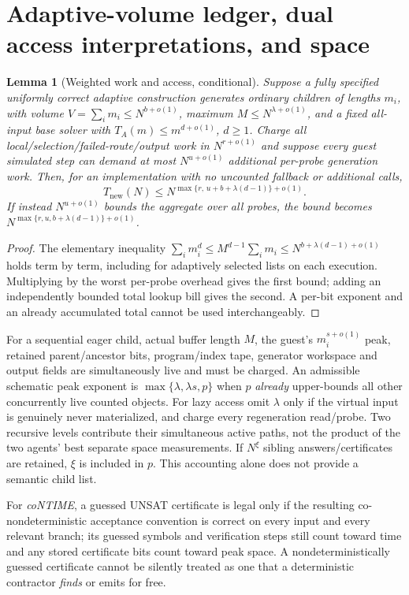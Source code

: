 \documentclass[11pt]{article}
\newtheorem{lemma}[theorem]{Lemma}
\begin{document}
\section{Adaptive-volume ledger, dual access interpretations, and space}
\begin{lemma}[Weighted work and access, conditional]\label{lem:volume}
Suppose a fully specified uniformly correct adaptive construction generates ordinary children of lengths $m_i$, with volume $V=\sum_i m_i\le N^{b+o(1)}$, maximum $M\le N^{\lambda+o(1)}$, and a fixed all-input base solver with $T_A(m)\le m^{d+o(1)}$, $d\ge1$. Charge all local/selection/failed-route/output work in $N^{r+o(1)}$ and suppose every guest simulated step can demand at most $N^{u+o(1)}$ \emph{additional per-probe} generation work. Then, for an implementation with no uncounted fallback or additional calls,
\[
T_{\mathrm{new}}(N)\le N^{\max\{r,\,u+b+\lambda(d-1)\}+o(1)}.
\]
If instead $N^{u+o(1)}$ bounds \emph{the aggregate over all probes}, the bound becomes
$N^{\max\{r,u,b+\lambda(d-1)\}+o(1)}$.
\end{lemma}
\begin{proof}
The elementary inequality $\sum_i m_i^d\le M^{d-1}\sum_i m_i\le N^{b+\lambda(d-1)+o(1)}$ holds term by term, including for adaptively selected lists on each execution. Multiplying by the worst per-probe overhead gives the first bound; adding an independently bounded total lookup bill gives the second. A per-bit exponent and an already accumulated total cannot be used interchangeably.
\end{proof}
For a sequential eager child, actual buffer length $M$, the guest's $m_i^{s+o(1)}$ peak, retained parent/ancestor bits, program/index tape, generator workspace and output fields are simultaneously live and must be charged. An admissible schematic peak exponent is $\max\{\lambda,\lambda s,p\}$ when $p$ \emph{already} upper-bounds all other concurrently live counted objects. For lazy access omit $\lambda$ only if the virtual input is genuinely never materialized, and charge every regeneration read/probe. Two recursive levels contribute their simultaneous active paths, not the product of the two agents' best separate space measurements. If $N^\xi$ sibling answers/certificates are retained, $\xi$ is included in $p$. This accounting alone does not provide a semantic child list.

For \emph{coNTIME}, a guessed UNSAT certificate is legal only if the resulting co-nondeterministic acceptance convention is correct on every input and every relevant branch; its guessed symbols and verification steps still count toward time and any stored certificate bits count toward peak space. A nondeterministically guessed certificate cannot be silently treated as one that a deterministic contractor \emph{finds} or emits for free.
\end{document}
